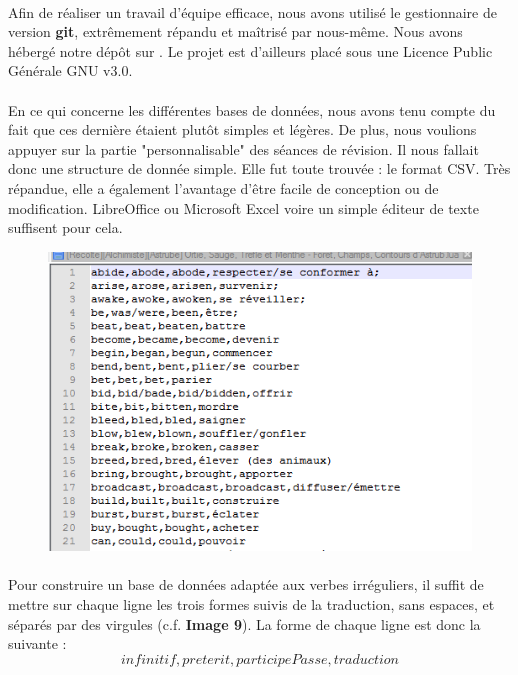 \documentclass[12pt, a4paper]{report}
\newcommand{\MYhref}[3][blue]{\href{#2}{\color{#1}{#3}}}%
\begin{document}
\paragraph{}Afin de réaliser un travail d'équipe efficace, nous avons utilisé le gestionnaire de version \textbf{git}, extrêmement répandu et maîtrisé par nous-même. Nous avons hébergé notre dépôt sur \MYhref{https://github.com/AOSauron}{\textit{GitHub}}. Le projet est d'ailleurs placé sous une Licence Public Générale GNU v3.0.
\newpage
\paragraph{}En ce qui concerne les différentes bases de données, nous avons tenu compte du fait que ces dernière étaient plutôt simples et légères. De plus, nous voulions appuyer sur la partie "personnalisable" des séances de révision. Il nous fallait donc une structure de donnée simple. Elle fut toute trouvée : le format CSV. Très répandue, elle a également l'avantage d'être facile de conception ou de modification. LibreOffice ou Microsoft Excel voire un simple éditeur de texte suffisent pour cela.


\begin{figure}[H]
    \centering
    \includegraphics[scale=0.80]{images/csv.png}
\end{figure}

\paragraph{}Pour construire un base de données adaptée aux verbes irréguliers, il suffit de mettre sur chaque ligne les trois formes suivis de la traduction, sans espaces, et séparés par des virgules (c.f. \textbf{Image 9}). La forme de chaque ligne est donc la suivante :
\[infinitif,preterit,participePasse,traduction\]
\end{document}
